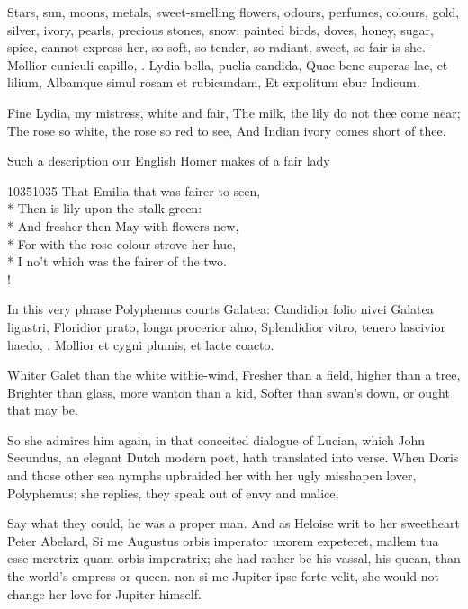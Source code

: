 Stars, sun, moons, metals, sweet-smelling flowers, odours, perfumes,
colours, gold, silver, ivory, pearls, precious stones, snow, painted
birds, doves, honey, sugar, spice, cannot express her, so soft,
so tender, so radiant, sweet, so fair is she.-Mollior cuniculi capillo,
\etc{}.
Lydia bella, puelia candida,
Quae bene superas lac, et lilium,
Albamque simul rosam et rubicundam,
Et expolitum ebur Indicum.

Fine Lydia, my mistress, white and fair,
The milk, the lily do not thee come near;
The rose so white, the rose so red to see,
And Indian ivory comes short of thee.

Such a description our English Homer makes of a fair lady
%
{\gothfont%
\begin{versewithlinenos}{2}{1035}{1035}%
That Emilia that was fairer to seen,\\*
Then is lily upon the stalk green:\\*
And fresher then May with flowers new,\\*
For with the rose colour strove her hue,\\*
I no't which was the fairer of the two.\\!
\end{versewithlinenos}%
}%

In this very phrase Polyphemus courts Galatea:
Candidior folio nivei Galatea ligustri,
Floridior prato, longa procerior alno,
Splendidior vitro, tenero lascivior haedo, \etc{}.
Mollior et cygni plumis, et lacte coacto.

Whiter Galet than the white withie-wind,
Fresher than a field, higher than a tree,
Brighter than glass, more wanton than a kid,
Softer than swan's down, or ought that may be.

So she admires him again, in that conceited dialogue of Lucian, which
John Secundus, an elegant Dutch modern poet, hath translated into
verse. When Doris and those other sea nymphs upbraided her with her
ugly misshapen lover, Polyphemus; she replies, they speak out of envy
and malice,

Say what they could, he was a proper man. And as Heloise writ to her
sweetheart Peter Abelard, Si me Augustus orbis imperator uxorem
expeteret, mallem tua esse meretrix quam orbis imperatrix; she had
rather be his vassal, his quean, than the world's empress or queen.-non
si me Jupiter ipse forte velit,-she would not change her love for
Jupiter himself.

